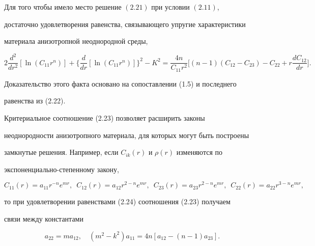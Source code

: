  


\begin{thm} 


Для того чтобы имело место решение $(2.21)$ при условии $(2.11)$, 


достаточно удовлетворения равенства, связывающего упругие характеристики 


материала анизотропной неоднородной среды, 


\begin{equation} 


2\frac{d^2}{dr^2}[\ln(C_{11}r^n)]+\biggl\{ 


\frac{d}{dr}[\ln(C_{11}r^n)]\biggr\}^2-K^2=\frac{4n}{C_{11}r^2} 


\biggl[(n-1)(C_{12}-C_{23})-C_{22}+r\frac{d C_{12}}{dr}\biggr]. 


\end{equation} 


\end{thm} 


 


Доказательство этого факта основано на сопоставлении (1.5) и последнего 


равенства из (2.22). 


 


Критериальное соотношение (2.23) позволяет расширить законы 


неоднородности анизотропного материала, для которых могут быть построены 


замкнутые решения. Например, если $C_{ik}(r)$ и $\rho(r)$ изменяются по 


экспоненциально-степенному закону, 


\begin{equation} 


C_{11}(r)=a_{11}r^{-n}e^{mr},\ \; C_{12}(r)=a_{12}r^{2-n}e^{mr}, 


\ \; C_{23}(r)=a_{23}r^{2-n}e^{mr},\ \;


C_{22}(r)=a_{22}r^{3-n}e^{mr}, 


\end{equation} 


то при удовлетворении равенствами (2.24) соотношения (2.23) получаем 


связи между константами 


\begin{equation} 


a_{22}=m a_{12},\quad (m^2-k^2)a_{11}=4n[a_{12}-(n-1)a_{23}]. 


\end{equation} 


